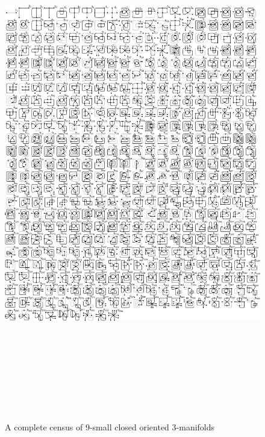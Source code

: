 \begin{figure}[h!tp]
   \begin{center}
      \leavevmode
      \includegraphics[height=22.5cm]{E.figsbw2/primespace487representants_bw.pdf}
   \end{center}
   \vspace{-0.7cm}
   \caption{A complete census of 9-small closed oriented 3-manifolds}
   \label{fig:primeSpace487Representatives}
\end{figure}

